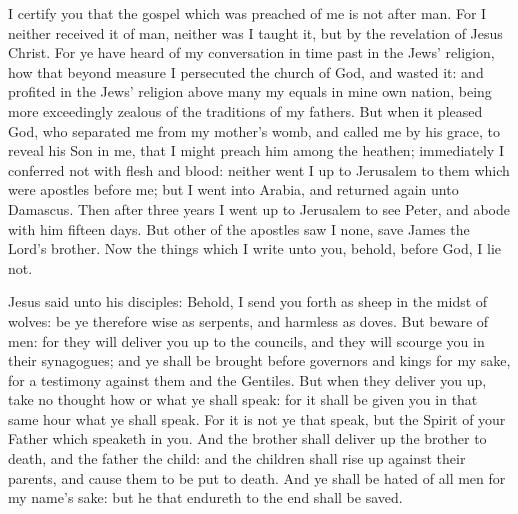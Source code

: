  I certify you that the gospel which was preached of me is not after man. For I neither received it of man, neither was I taught it, but by the revelation of Jesus Christ. For ye have heard of my conversation in time past in the Jews' religion, how that beyond measure I persecuted the church of God, and wasted it: and profited in the Jews' religion above many my equals in mine own nation, being more exceedingly zealous of the traditions of my fathers. But when it pleased God, who separated me from my mother’s womb, and called me by his grace, to reveal his Son in me, that I might preach him among the heathen; immediately I conferred not with flesh and blood: neither went I up to Jerusalem to them which were apostles before me; but I went into Arabia, and returned again unto Damascus. Then after three years I went up to Jerusalem to see Peter, and abode with him fifteen days. But other of the apostles saw I none, save James the Lord’s brother. Now the things which I write unto you, behold, before God, I lie not.


\vspace{-0.5\baselineskip}


\vspace{-0.1\baselineskip}

 Jesus said unto his disciples: Behold, I send you forth as sheep in the midst of wolves: be ye therefore wise as serpents, and harmless as doves. But beware of men: for they will deliver you up to the councils, and they will scourge you in their synagogues; and ye shall be brought before governors and kings for my sake, for a testimony against them and the Gentiles. But when they deliver you up, take no thought how or what ye shall speak: for it shall be given you in that same hour what ye shall speak. For it is not ye that speak, but the Spirit of your Father which speaketh in you. And the brother shall deliver up the brother to death, and the father the child: and the children shall rise up against their parents, and cause them to be put to death. And ye shall be hated of all men for my name's sake: but he that endureth to the end shall be saved. 

